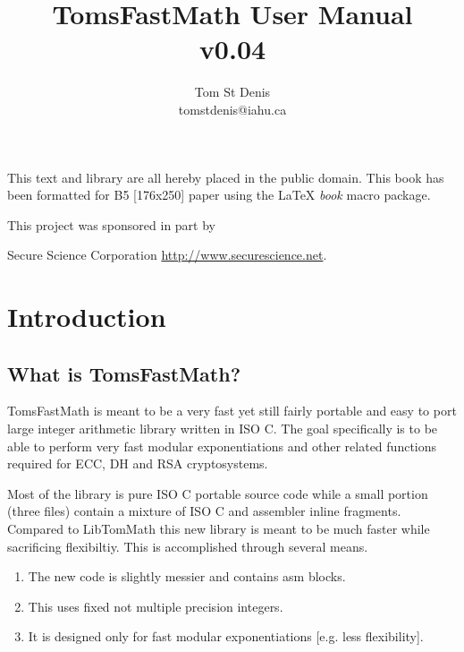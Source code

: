 \documentclass[b5paper]{book}
\begin{document}
\frontmatter
\pagestyle{empty}
\title{TomsFastMath User Manual \\ v0.04}
\author{Tom St Denis \\ tomstdenis@iahu.ca}
\maketitle
This text and library are all hereby placed in the public domain.  This book has been formatted for B5 
[176x250] paper using the \LaTeX{} {\em book} macro package.

\vspace{13cm}

\begin{flushleft}This project was sponsored in part by  

Secure Science Corporation \url{http://www.securescience.net}.
\end{flushleft}

\tableofcontents
\listoffigures
\mainmatter
\pagestyle{headings}
\chapter{Introduction}
\section{What is TomsFastMath?}

TomsFastMath is meant to be a very fast yet still fairly portable and easy to port large
integer arithmetic library written in ISO C.  The goal specifically is to be able to perform
very fast modular exponentiations and other related functions required for ECC, DH and RSA
cryptosystems.

Most of the library is pure ISO C portable source code while a small portion (three files) contain
a mixture of ISO C and assembler inline fragments.  Compared to LibTomMath this new library is 
meant to be much faster while sacrificing flexibiltiy.  This is accomplished through several means.

\begin{enumerate}
   \item The new code is slightly messier and contains asm blocks.
   \item This uses fixed not multiple precision integers.  
   \item It is designed only for fast modular exponentiations [e.g. less flexibility].
\end{enumerate}
\end{document}
